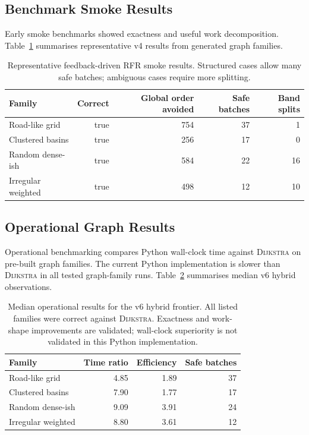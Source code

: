 \documentclass[11pt]{article}
\newcommand{\RFR}{\textsc{RFR}}
\newcommand{\Dijkstra}{\textsc{Dijkstra}}
\begin{document}
\subsection{Benchmark Smoke Results}

Early smoke benchmarks showed exactness and useful work decomposition. Table~\ref{tab:smoke} summarises representative v4 results from generated graph families.

\begin{table}[htbp]
\centering
\begin{tabular}{lrrrr}
\toprule
Family & Correct & Global order avoided & Safe batches & Band splits \\
\midrule
Road-like grid & true & 754 & 37 & 1 \\
Clustered basins & true & 256 & 17 & 0 \\
Random dense-ish & true & 584 & 22 & 16 \\
Irregular weighted & true & 498 & 12 & 10 \\
\bottomrule
\end{tabular}
\caption{Representative feedback-driven \RFR{} smoke results. Structured cases allow many safe batches; ambiguous cases require more splitting.}
\label{tab:smoke}
\end{table}

\subsection{Operational Graph Results}

Operational benchmarking compares Python wall-clock time against \Dijkstra{} on pre-built graph families. The current Python implementation is slower than \Dijkstra{} in all tested graph-family runs. Table~\ref{tab:operational} summarises median v6 hybrid observations.

\begin{table}[htbp]
\centering
\begin{tabular}{lrrr}
\toprule
Family & Time ratio & Efficiency & Safe batches \\
\midrule
Road-like grid & 4.85 & 1.89 & 37 \\
Clustered basins & 7.90 & 1.77 & 17 \\
Random dense-ish & 9.09 & 3.91 & 24 \\
Irregular weighted & 8.80 & 3.61 & 12 \\
\bottomrule
\end{tabular}
\caption{Median operational results for the v6 hybrid frontier. All listed families were correct against \Dijkstra{}. Exactness and work-shape improvements are validated; wall-clock superiority is not validated in this Python implementation.}
\label{tab:operational}
\end{table}
\end{document}
